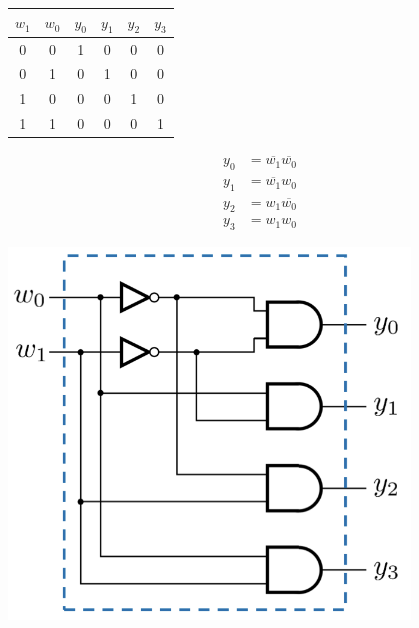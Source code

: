 \documentclass[12pt,openany]{book}
\begin{document}
\hspace*{18px}
\begin{minipage}[htp]{0.45\textwidth}
\begin{center}
		    \begin{tabular}{|c|c||c|c|c|c|}
		        \hline
		        $w_1$ & $w_0$ & $y_0$ & $y_1$ & $y_2$ & $y_3$ \\
		        \hline
		        0 & 0 & 1 & 0 & 0 & 0 \\
		        0 & 1 & 0 & 1 & 0 & 0 \\
		        1 & 0 & 0 & 0 & 1 & 0 \\
		        1 & 1 & 0 & 0 & 0 & 1 \\
		        \hline
		    \end{tabular}\newline
\end{center}
\begin{center}
			\begin{align*}
				y_0 &= \overline{w_1} \overline{w_0} \\
				y_1 &= \overline{w_1} w_0 \\
				y_2 &= w_1 \overline{w_0} \\
				y_3 &= w_1 w_0
				\end{align*}
\end{center}


\end{minipage} \hfill
\vline
\hfill
\begin{minipage}[htp]{0.40\textwidth}
    \begin{center}
        \includegraphics[width=0.8\textwidth]{circuits/16.1_3.png}
    \end{center}
\end{minipage}
\end{document}
